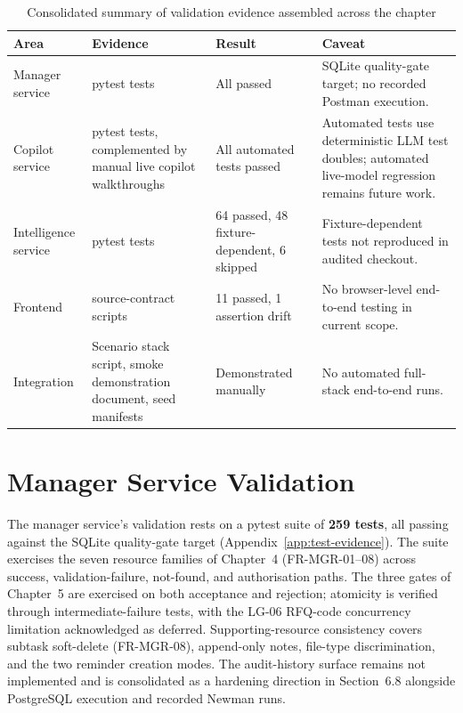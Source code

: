 \begin{table}[H]
\centering
\renewcommand{\arraystretch}{1.4}
\begin{tabularx}{\textwidth}{|p{2.4cm}|>{\RaggedRight\arraybackslash}X|p{3.6cm}|>{\RaggedRight\arraybackslash}X|}
\hline
\rowcolor{lightgray}
\textbf{Area} & \textbf{Evidence} & \textbf{Result} & \textbf{Caveat} \\ \hline
Manager service & 259 pytest tests & All passed & SQLite quality-gate target; no recorded Postman execution. \\ \hline
Copilot service & 636 pytest tests, complemented by manual live copilot walkthroughs & All automated tests passed & Automated tests use deterministic LLM test doubles; automated live-model regression remains future work. \\ \hline
Intelligence service & 118 pytest tests & 64 passed, 48 fixture-dependent, 6 skipped & Fixture-dependent tests not reproduced in audited checkout. \\ \hline
Frontend & 12 source-contract scripts & 11 passed, 1 assertion drift & No browser-level end-to-end testing in current scope. \\ \hline
Integration & Scenario stack script, smoke demonstration document, seed manifests & Demonstrated manually & No automated full-stack end-to-end runs. \\ \hline
\end{tabularx}
\caption{Consolidated summary of validation evidence assembled across the chapter}
\label{tab:validation_summary}
\end{table}

\section{Manager Service Validation}
The manager service's validation rests on a pytest suite of \textbf{259 tests}, all passing against the SQLite quality-gate target (Appendix~\ref{app:test-evidence}). The suite exercises the seven resource families of Chapter~4 (FR-MGR-01--08) across success, validation-failure, not-found, and authorisation paths. The three gates of Chapter~5 are exercised on both acceptance and rejection; atomicity is verified through intermediate-failure tests, with the LG-06 RFQ-code concurrency limitation acknowledged as deferred. Supporting-resource consistency covers subtask soft-delete (FR-MGR-08), append-only notes, file-type discrimination, and the two reminder creation modes. The audit-history surface remains not implemented and is consolidated as a hardening direction in Section~6.8 alongside PostgreSQL execution and recorded Newman runs.

